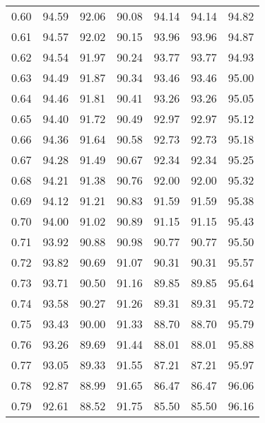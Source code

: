 \begin{tabular}{|c|c|c|c|c|c|c|}
      0.60 &     94.59 &     92.06 &      90.08 &   94.14 &      94.14 &         94.82 \\
      0.61 &     94.57 &     92.02 &      90.15 &   93.96 &      93.96 &         94.87 \\
      0.62 &     94.54 &     91.97 &      90.24 &   93.77 &      93.77 &         94.93 \\
      0.63 &     94.49 &     91.87 &      90.34 &   93.46 &      93.46 &         95.00 \\
      0.64 &     94.46 &     91.81 &      90.41 &   93.26 &      93.26 &         95.05 \\
      0.65 &     94.40 &     91.72 &      90.49 &   92.97 &      92.97 &         95.12 \\
      0.66 &     94.36 &     91.64 &      90.58 &   92.73 &      92.73 &         95.18 \\
      0.67 &     94.28 &     91.49 &      90.67 &   92.34 &      92.34 &         95.25 \\
      0.68 &     94.21 &     91.38 &      90.76 &   92.00 &      92.00 &         95.32 \\
      0.69 &     94.12 &     91.21 &      90.83 &   91.59 &      91.59 &         95.38 \\
      0.70 &     94.00 &     91.02 &      90.89 &   91.15 &      91.15 &         95.43 \\
      0.71 &     93.92 &     90.88 &      90.98 &   90.77 &      90.77 &         95.50 \\
      0.72 &     93.82 &     90.69 &      91.07 &   90.31 &      90.31 &         95.57 \\
      0.73 &     93.71 &     90.50 &      91.16 &   89.85 &      89.85 &         95.64 \\
      0.74 &     93.58 &     90.27 &      91.26 &   89.31 &      89.31 &         95.72 \\
      0.75 &     93.43 &     90.00 &      91.33 &   88.70 &      88.70 &         95.79 \\
      0.76 &     93.26 &     89.69 &      91.44 &   88.01 &      88.01 &         95.88 \\
      0.77 &     93.05 &     89.33 &      91.55 &   87.21 &      87.21 &         95.97 \\
      0.78 &     92.87 &     88.99 &      91.65 &   86.47 &      86.47 &         96.06 \\
      0.79 &     92.61 &     88.52 &      91.75 &   85.50 &      85.50 &         96.16 \\

\end{tabular}
